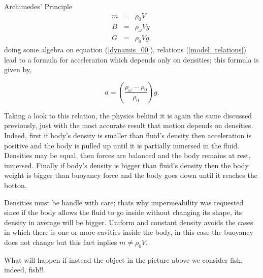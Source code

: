 \begin{section}{Archimedes' Principle}
    \begin{eqnarray}
        m &=& \rho_0 V
        \nonumber \\
        \label{model_relations}
        B &=& \rho_{\omega} V g \\
        G &=& \rho_0 V g,
        \nonumber
    \end{eqnarray}
    doing some algebra on equation (\ref{dynamis_00}), relations (\ref{model_relations}) lead
    to a formula for accelerarion which depends only on densities; this formula is given by,
    
    \begin{equation}
        \label{dynamis_01}
        a = \left(\frac{\rho_{\omega} - \rho_0}{\rho_0} \right)g.
    \end{equation}
    
    Taking a look to this relation, the physics behind it is again the same discussed previously,
    just with the most accurate result that motion depends on densities. Indeed, first if body's 
    density is smaller than fluid's density then acceleration is positive and the body is pulled 
    up until it is partially inmersed in the fluid. Densities may be equal, then forces are 
    balanced and the body remains at rest, inmersed. Finally if body's density is bigger than 
    fluid's density then the body weight is bigger than buoyancy force and the body goes down until 
    it reaches the botton.
    
    Densities must be handle with care; thats why impermeability was requested since if the body
    allows the fluid to go inside without changing its shape, its density in average will be 
    bigger. Uniform and constant density avoids the cases in which there is one or more cavities 
    inside the body, in this case the buoyancy does not change but this fact inplies $ m \neq \rho_0 V$.
    
    What will happen if instead the object in the picture above we consider fish, indeed, fish!!. 
\end{section}
